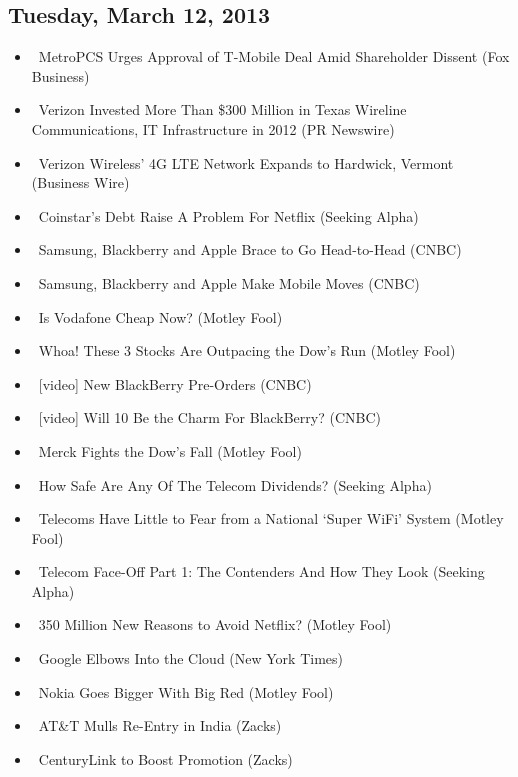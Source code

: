 \documentclass[11pt,asymmetric]{article}
\begin{document}
\subsection*{Tuesday, March 12, 2013}
\begin{itemize}
\item\ MetroPCS Urges Approval of T-Mobile Deal Amid Shareholder Dissent (Fox Business)
\item\ Verizon Invested More Than \$300 Million in Texas Wireline Communications, IT Infrastructure in 2012 (PR Newswire)
\item\ Verizon Wireless’ 4G LTE Network Expands to Hardwick, Vermont (Business Wire)
\item\ Coinstar's Debt Raise A Problem For Netflix (Seeking Alpha)
\item\ Samsung, Blackberry and Apple Brace to Go Head-to-Head (CNBC)
\item\ Samsung, Blackberry and Apple Make Mobile Moves (CNBC)
\item\ Is Vodafone Cheap Now? (Motley Fool)
\item\ Whoa! These 3 Stocks Are Outpacing the Dow's Run (Motley Fool)
\item\ [video] New BlackBerry Pre-Orders (CNBC)
\item\ [video] Will 10 Be the Charm For BlackBerry? (CNBC)
\item\ Merck Fights the Dow's Fall (Motley Fool)
\item\ How Safe Are Any Of The Telecom Dividends? (Seeking Alpha)
\item\ Telecoms Have Little to Fear from a National `Super WiFi' System (Motley Fool)
\item\ Telecom Face-Off Part 1: The Contenders And How They Look (Seeking Alpha)
\item\ 350 Million New Reasons to Avoid Netflix? (Motley Fool)
\item\ Google Elbows Into the Cloud (New York Times)
\item\ Nokia Goes Bigger With Big Red (Motley Fool)
\item\ AT\&T Mulls Re-Entry in India (Zacks)
\item\ CenturyLink to Boost Promotion (Zacks)
\end{itemize}
\end{document}
